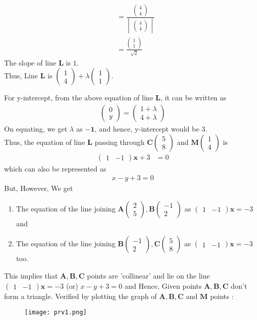 \documentclass[journal,12pt,twocolumn]{IEEEtran}
\let\vec\mathbf
\newcommand{\mydet}[1]{\ensuremath{\begin{vmatrix}#1\end{vmatrix}}}
\newcommand{\myvec}[1]{\ensuremath{\begin{pmatrix}#1\end{pmatrix}}}
\begin{document}
\begin{enumerate}
\begin{align}
   &= \frac{\myvec{4\\4}}{\mydet{\myvec{4\\4}}}\\
   &= \frac{\myvec{1\\1}}{\sqrt{2}}
\end{align}
The slope of line $\vec{L}$ is $1$.
\\
Thus, Line $\vec{L}$ is $\myvec{1\\4} + \lambda\myvec{1\\1}$. 

 For y-intercept, from the above equation of line $\vec{L}$, it can be written as
 \begin{align}
     \myvec{0\\y} = \myvec{1+\lambda\\4+\lambda} 
 \end{align}
On equating, we get $\lambda$ as $\vec{-1}$, and hence, y-intercept would be $3$.
\\
Thus, the equation of line $\vec{L}$ passing through  $\vec{C}\myvec{5\\8}$ and $\vec{M}\myvec{1\\4}$ is 
\begin{align}
    \myvec{1 & - 1}\vec{x} + 3 &= 0
\end{align}
 which can also be represented as 
 \begin{align}
     x-y+3=0
 \end{align}
 \newpage
{\large But, However,}
We get
\newline
\begin{enumerate}
    \item The equation of the line joining $\vec{A}\myvec{2\\5}, \vec{B}\myvec{-1\\2}$ as $\myvec{1 & - 1}\vec{x} = -3$ and 
    \newline
    \item The equation of the line joining $\vec{B}\myvec{-1\\2}, \vec{C}\myvec{5\\8}$ as $\myvec{1 & - 1}\vec{x}=-3$ too.\newline
\end{enumerate}
 This implies that $\vec{A,B,C}$ points are 'collinear' and lie on the line $\myvec{1 & - 1}\vec{x} = -3$ (or) $x-y+3=0$ and Hence, Given points $\vec{A,B,C}$ don't form a triangle.
\newline
\large Verified by plotting the graph of $\vec{A,B,C}$ and $\vec{M}$ points :

\begin{figure}[ht!]
\centering
\texttt{[image: prv1.png]}
\end{figure}

\end{enumerate}
\end{document}
